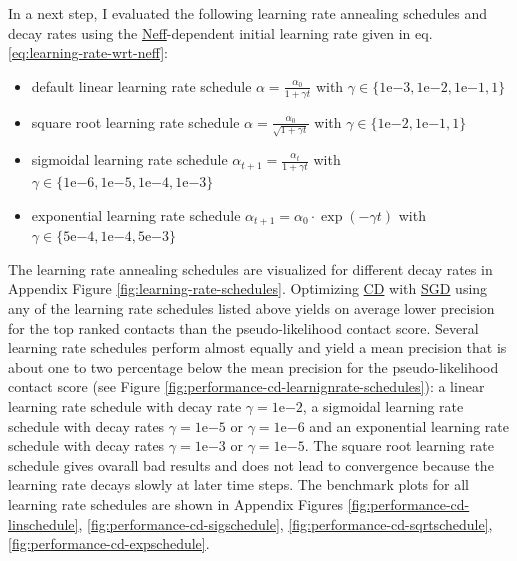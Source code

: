 \documentclass[11pt,a4paper,twoside]{book}
\providecommand{\tightlist}{%
  \setlength{\itemsep}{0pt}\setlength{\parskip}{0pt}}
\newcommand{\eq}{\!=\!}
\theoremstyle{definition}
\theoremstyle{definition}
\theoremstyle{remark}
\begin{document}
In a next step, I evaluated the following learning rate annealing
schedules and decay rates using the
\protect\hyperlink{abbrev}{Neff}-dependent initial learning rate given
in eq. \eqref{eq:learning-rate-wrt-neff}:

\begin{itemize}
\tightlist
\item
  default linear learning rate schedule
  \(\alpha = \frac{\alpha_0}{1 + \gamma t}\) with
  \(\gamma \in \{1\mathrm{e}{-3}, 1\mathrm{e}{-2}, 1\mathrm{e}{-1}, 1 \}\)
\item
  square root learning rate schedule
  \(\alpha = \frac{\alpha_0}{\sqrt{1 + \gamma t}}\) with
  \(\gamma \in \{1\mathrm{e}{-2}, 1\mathrm{e}{-1}, 1 \}\)
\item
  sigmoidal learning rate schedule
  \(\alpha_{t+1} = \frac{\alpha_{t}}{1 + \gamma t}\) with
  \(\gamma \in \{1\mathrm{e}{-6}, 1\mathrm{e}{-5}, 1\mathrm{e}{-4}, 1\mathrm{e}{-3}\}\)
\item
  exponential learning rate schedule
  \(\alpha_{t+1} = \alpha_0 \cdot\exp(- \gamma t)\) with
  \(\gamma \in \{5\mathrm{e}{-4}, 1\mathrm{e}{-4}, 5\mathrm{e}{-3}\}\)
\end{itemize}

The learning rate annealing schedules are visualized for different decay
rates in Appendix Figure \ref{fig:learning-rate-schedules}. Optimizing
\protect\hyperlink{abbrev}{CD} with \protect\hyperlink{abbrev}{SGD}
using any of the learning rate schedules listed above yields on average
lower precision for the top ranked contacts than the pseudo-likelihood
contact score. Several learning rate schedules perform almost equally
and yield a mean precision that is about one to two percentage below the
mean precision for the pseudo-likelihood contact score (see Figure
\ref{fig:performance-cd-learnignrate-schedules}): a linear learning rate
schedule with decay rate \(\gamma \eq 1\mathrm{e}{-2}\), a sigmoidal
learning rate schedule with decay rates \(\gamma \eq 1\mathrm{e}{-5}\)
or \(\gamma \eq 1\mathrm{e}{-6}\) and an exponential learning rate
schedule with decay rates \(\gamma \eq 1\mathrm{e}{-3}\) or
\(\gamma \eq 1\mathrm{e}{-5}\). The square root learning rate schedule
gives ovarall bad results and does not lead to convergence because the
learning rate decays slowly at later time steps. The benchmark plots for
all learning rate schedules are shown in Appendix Figures
\ref{fig:performance-cd-linschedule},
\ref{fig:performance-cd-sigschedule},
\ref{fig:performance-cd-sqrtschedule},
\ref{fig:performance-cd-expschedule}.
\end{document}
